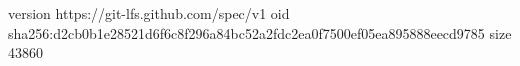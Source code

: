 version https://git-lfs.github.com/spec/v1
oid sha256:d2cb0b1e28521d6f6c8f296a84bc52a2fdc2ea0f7500ef05ea895888eecd9785
size 43860
